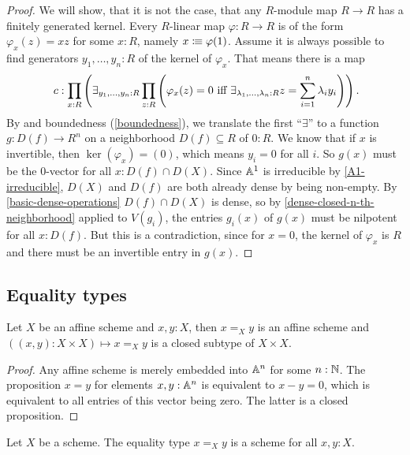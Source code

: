 \begin{proof}
  We will show, that it is not the case,
  that any $R$-module map $R\to R$ has a finitely generated kernel.
  Every $R$-linear map $\varphi:R\to R$
  is of the form $\varphi_x(z) = xz$ for some $x : R$,
  namely $x\vcentcolon\mspace{-1.2mu}\equiv \varphi(1)$.
  Assume it is always possible to find generators $y_1,\dots,y_n:R$ of the kernel of $\varphi_x$.
  That means there is a map
  \[
    c:\prod_{x:R}
    \left(
      \exists_{y_1,\dots,y_n:R}
      \prod_{z:R}
      \left(
        \varphi_x(z)=0 \text{ iff } \exists_{\lambda_1,\dots,\lambda_n:R}z=\sum_{i=1}^n \lambda_i y_i
      \right)
    \right)
    \rlap{.}
  \]
  By  and boundedness (\cref{boundedness}),
  we translate the first ``$\exists$'' to a function $g : D(f) \to R^n$
  on a neighborhood $D(f) \subseteq R$ of $0:R$.
  We know that if $x$ is invertible, then $\ker(\varphi_x)=(0)$, which means $y_i=0$ for all $i$.
  So $g(x)$ must be the 0-vector for all $x:D(f)\cap D(X)$.
  Since $\mathbb{A}^1$ is irreducible by \cref{A1-irreducible},
  $D(X)$ and $D(f)$ are both already dense by being non-empty.
  By \cref{basic-dense-operations} $D(f)\cap D(X)$ is dense,
  so by \cref{dense-closed-n-th-neighborhood} applied to $V(g_i)$,
  the entries $g_i(x)$ of $g(x)$ must be nilpotent for all $x:D(f)$.
  But this is a contradiction, since for $x = 0$,
  the kernel of $\varphi_x$ is $R$ and there must be an invertible entry in $g(x)$.
\end{proof}

\subsection{Equality types}

\begin{lemma}%
  \label{affine-equality-closed}
  Let $X$ be an affine scheme and $x,y:X$,
  then $x=_Xy$ is an affine scheme
  and $((x,y):X\times X)\mapsto x=_Xy$
  is a closed subtype of $X\times X$.
\end{lemma}

\begin{proof}
  Any affine scheme is merely embedded into $\mathbb{A}^n$ for some $n:\mathbb{N}$.
  The proposition $x=y$ for elements $x,y:\mathbb{A}^n$ is equivalent to $x-y=0$,
  which is equivalent to all entries of this vector being zero.
  The latter is a closed proposition.
\end{proof}

\begin{proposition}%
  \label{equality-scheme}
  Let $X$ be a scheme.
  The equality type $x=_Xy$ is a scheme for all $x,y:X$.
\end{proposition}

